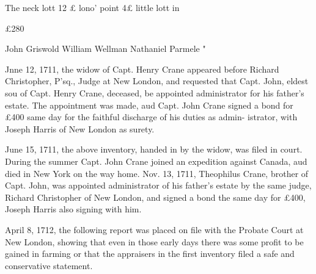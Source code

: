 \documentclass{book}
\begin{document}
The neck lott 12 £ lono' point 4£ little lott in 








£280   

John Griswold 
William Wellman 
Nathaniel Parmele " 



Jnne 12, 1711, the widow of Capt. Henry Crane appeared 
before Richard Christopher, P'sq., Judge at New London, and 
requested that Capt. John, eldest sou of Capt. Henry Crane, 
deceased, be appointed administrator for his father's estate. The 
appointment was made, aud Capt. John Crane signed a bond for 
£400 same day for the faithful discharge of his duties as admin- 
istrator, with Joseph Harris of New London as surety. 

June 15, 1711, the above inventory, handed in by the widow, 
was filed in court. During the summer Capt. John Crane joined 
an expedition against Canada, aud died in New York on the way 
home. Nov. 13, 1711, Theophilus Crane, brother of Capt. John, 
was appointed administrator of his father's estate by the same 
judge, Richard Christopher of New London, and signed a bond 
the same day for £400, Joseph Harris also signing with him. 

April 8, 1712, the following report was placed on file with the 
Probate Court at New London, showing that even in those early 
days there was some profit to be gained in farming or that the 
appraisers in the first inventory filed a safe and conservative 
statement. 
\end{document}
